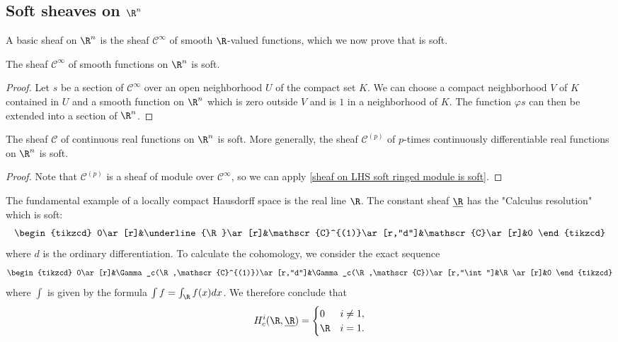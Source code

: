 \subsection{Soft sheaves on \texorpdfstring{$\R^n$}{R}}
A basic sheaf on $\R^n$ is the sheaf $\mathscr{C}^\infty$ of smooth $\R$-valued functions, which we now prove that is soft.

\begin{theorem}\label{sheaf of smooth function soft}
The sheaf $\mathscr{C}^\infty$ of smooth functions on $\R^n$ is soft.
\end{theorem}
\begin{proof}
Let $s$ be a section of $\mathscr{C}^\infty$ over an open neighborhood $U$ of the compact set $K$. We can choose a compact neighborhood $V$ of $K$ contained in $U$ and a smooth function on $\R^n$ which is zero outside $V$ and is $1$ in a neighborhood of $K$. The function $\varphi s$ can then be extended into a section of $\R^n$.
\end{proof}

\begin{corollary}
The sheaf $\mathscr{C}$ of continuous real functions on $\R^n$ is soft. More generally, the sheaf $\mathscr{C}^{(p)}$ of $p$-times continuously differentiable real functions on $\R^n$ is soft.
\end{corollary}
\begin{proof}
Note that $\mathscr{C}^{(p)}$ is a sheaf of module over $\mathscr{C}^\infty$, so we can apply \cref{sheaf on LHS soft ringed module is soft}.
\end{proof}

\begin{example}
The fundamental example of a locally compact Hausdorff space is the real line $\R$. The constant sheaf $\underline{\R}$ has the "Calculus resolution" which is soft:
\[\begin{tikzcd}
0\ar[r]&\underline{\R}\ar[r]&\mathscr{C}^{(1)}\ar[r,"d"]&\mathscr{C}\ar[r]&0
\end{tikzcd}\]
where $d$ is the ordinary differentiation. To calculate the cohomology, we consider the exact sequence
\[\begin{tikzcd}
0\ar[r]&\Gamma_c(\R,\mathscr{C}^{(1)})\ar[r,"d"]&\Gamma_c(\R,\mathscr{C})\ar[r,"\int"]&\R\ar[r]&0
\end{tikzcd}\]
where $\int$ is given by the formula $\int f=\int_{\R}f(x)dx$. We therefore conclude that
\[H_c^i(\R,\underline{\R})=\begin{cases}
0&i\neq 1,\\
\R&i=1.
\end{cases}\]
\end{example}

\begin{proposition}

\end{proposition}